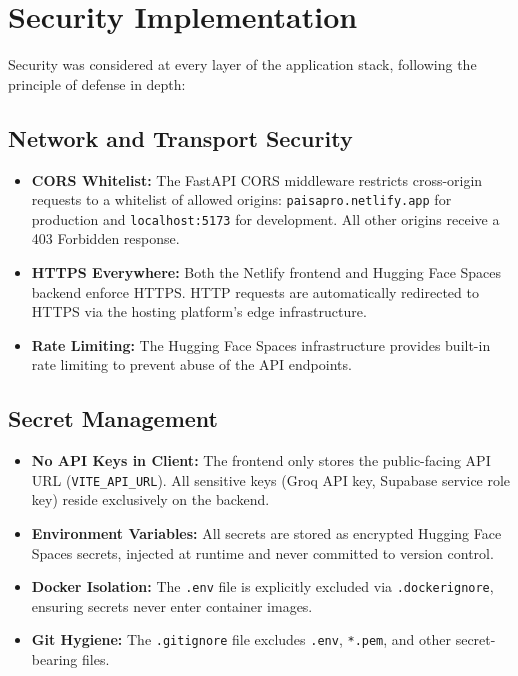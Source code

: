 \documentclass[12pt, a4paper, oneside]{report}
\begin{document}
\section{Security Implementation}
\label{sec:security}

Security was considered at every layer of the application stack, following the principle of defense in depth:

\subsection{Network and Transport Security}

\begin{itemize}[nosep]
    \item \textbf{CORS Whitelist:} The FastAPI CORS middleware restricts cross-origin requests to a whitelist of allowed origins: \texttt{paisapro.netlify.app} for production and \texttt{localhost:5173} for development. All other origins receive a 403 Forbidden response.
    \item \textbf{HTTPS Everywhere:} Both the Netlify frontend and Hugging Face Spaces backend enforce HTTPS. HTTP requests are automatically redirected to HTTPS via the hosting platform's edge infrastructure.
    \item \textbf{Rate Limiting:} The Hugging Face Spaces infrastructure provides built-in rate limiting to prevent abuse of the API endpoints.
\end{itemize}

\subsection{Secret Management}

\begin{itemize}[nosep]
    \item \textbf{No API Keys in Client:} The frontend only stores the public-facing API URL (\texttt{VITE\_API\_URL}). All sensitive keys (Groq API key, Supabase service role key) reside exclusively on the backend.
    \item \textbf{Environment Variables:} All secrets are stored as encrypted Hugging Face Spaces secrets, injected at runtime and never committed to version control.
    \item \textbf{Docker Isolation:} The \texttt{.env} file is explicitly excluded via \texttt{.dockerignore}, ensuring secrets never enter container images.
    \item \textbf{Git Hygiene:} The \texttt{.gitignore} file excludes \texttt{.env}, \texttt{*.pem}, and other secret-bearing files.
\end{itemize}
\end{document}
